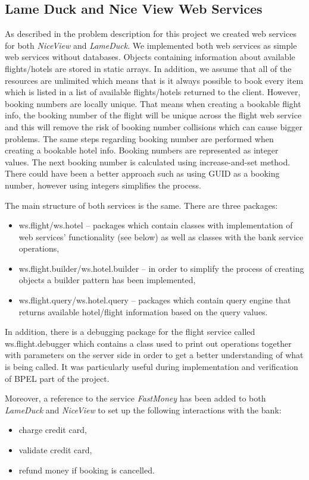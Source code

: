 \subsection{Lame Duck and Nice View Web Services}
As described in the problem description for this project we created web services for both \textit{NiceView} and \textit{LameDuck}. We implemented both web services as simple web services without databases. Objects containing information about available flights/hotels are stored in static arrays. In addition, we assume that all of the resources are unlimited which means that is it always possible to book every item which is listed in a list of available flights/hotels returned to the client. However, booking numbers are locally unique. That means when creating a bookable flight info, the booking number of the flight will be unique across the flight web service and this will remove the risk of booking number collisions which can cause bigger problems. The same steps regarding booking number are performed when creating a bookable hotel info. Booking numbers are represented as integer values. The next booking number is calculated using increase-and-set method. There could have been a better approach such as using GUID as a booking number, however using integers simplifies the process.

The main structure of both services is the same. There are three packages:

\begin{itemize}
\item ws.flight/ws.hotel -- packages which contain classes with implementation of web services’ functionality (see below) as well as classes with the bank service operations,
\item ws.flight.builder/ws.hotel.builder -- in order to simplify the process of creating objects a builder pattern has been implemented,
\item ws.flight.query/ws.hotel.query --  packages which contain query engine that returns available hotel/flight information based on the query values.
\end{itemize}
In addition, there is a debugging package for the flight service called ws.flight.debugger which contains a class used to print out operations together with parameters on the server side in order to get a better understanding of what is being called. It was particularly useful during implementation and verification of BPEL part of the project.

Moreover, a reference to the service \textit{FastMoney} has been added to both \textit{LameDuck} and \textit{NiceView} to set up the following interactions with the bank: 
\begin{itemize}
\item charge credit card,
\item validate credit card,
\item refund money if booking is cancelled.
\end{itemize}

